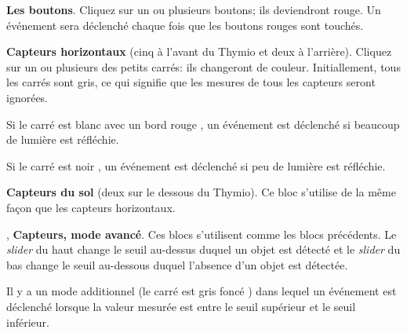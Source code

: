 \label{a.blocks}


 \textbf{Les boutons}.
Cliquez sur un ou plusieurs boutons;
ils deviendront rouge. Un événement sera déclenché chaque fois que les boutons rouges sont touchés.

\bigskip\bigskip

 \textbf{Capteurs horizontaux} (cinq à l'avant du Thymio et deux à l'arrière).
Cliquez sur un ou plusieurs des petits carrés: ils changeront de couleur.
Initiallement, tous les carrés sont gris, ce qui signifie que les mesures de tous les capteurs seront 
ignorées.

Si le carré est blanc avec un bord rouge , un événement est déclenché
si beaucoup de lumière est réfléchie.

Si le carré est noir , un événement est déclenché si peu de lumière est réfléchie.

\bigskip


\bigskip

 \textbf{Capteurs du sol} (deux sur le dessous du Thymio).
Ce bloc s'utilise de la même façon que les capteurs horizontaux.

\bigskip\bigskip

,  \textbf{Capteurs, mode avancé}.
Ces blocs s'utilisent comme les blocs précédents. Le \emph{slider} du haut change le seuil au-dessus duquel un objet est détecté et le \emph{slider} du bas change le seuil au-dessous duquel l'absence d'un
objet est détectée.

\bigskip\bigskip

Il y a un mode additionnel (le carré est gris foncé )
dans lequel un événement est déclenché lorsque la valeur mesurée est entre le seuil supérieur et
le seuil inférieur.

